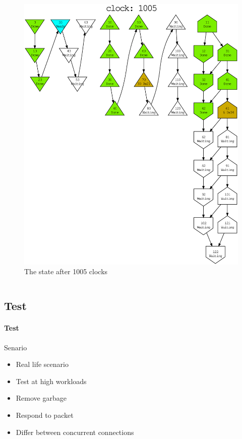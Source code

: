\begin{frame}[fragile]
\begin{columns}
\begin{column}{0.50\textwidth}
\begin{figure}
                \includegraphics[scale=0.21]{evaluation/dot_files/example_graph_running_compact.eps}
                \caption{The state after 1005 clocks}
            \end{figure}
        \end{column}
    \end{columns}
\end{frame}

\begin{frame}%
    \frametitle{\EvaluationTitle}
    \subsection{Test}
    \framesubtitle{Test}
    Senario
    \begin{itemize}%
        \item Real life scenario
        \item Test at high workloads
        \item Remove garbage
        \item Respond to packet
        \item Differ between concurrent connections
    \end{itemize}
\end{frame}

